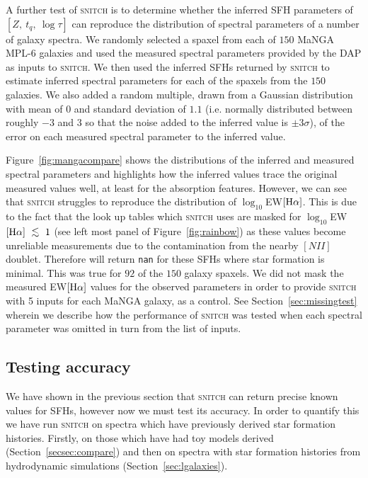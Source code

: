 \documentclass[useAMS,usenatbib]{mn2e}
\def\lesssim{\mathrel{\hbox{\rlap{\hbox{\lower3pt\hbox{$\sim$}}}\hbox{\raise2pt\hbox{$<$}}}}}
\begin{document}
A further test of \textsc{snitch} is to determine whether the inferred SFH parameters of $[Z,~t_q,~\log\tau]$ can reproduce the distribution of spectral parameters of a number of galaxy spectra. We randomly selected a spaxel from each of $150$ MaNGA MPL-6 galaxies  and used the measured spectral parameters provided by the DAP as inputs to \textsc{snitch}. We then used the inferred SFHs returned by \textsc{snitch} to estimate inferred spectral parameters for each of the spaxels from the $150$ galaxies. We also added a random multiple, drawn from a Gaussian distribution with mean of $0$ and standard deviation of $1.1$ (i.e. normally distributed between roughly $-3$ and $3$ so that the noise added to the inferred value is $\pm3\sigma$), of the error on each measured spectral parameter to the inferred value.

Figure~\ref{fig:mangacompare} shows the distributions of the inferred and measured spectral parameters and highlights how the inferred values trace the original measured values well, at least for the absorption features. However, we can see that \textsc{snitch} struggles to reproduce the distribution of $\log_{10}$EW$[\rm{H}\alpha]$. This is due to the fact that the look up tables which \textsc{snitch} uses are masked for $\log_{10}$EW$[\rm{H}\alpha]~\lesssim~1$ (see left most panel of Figure~\ref{fig:rainbow}) as these values become unreliable measurements due to the contamination from the nearby $[NII]$ doublet. Therefore  will return \texttt{nan} for these SFHs where star formation is minimal. This was true for $92$ of the $150$ galaxy spaxels. We did not mask the measured EW$[\rm{H}\alpha]$ values for the observed parameters in order to provide \textsc{snitch} with 5 inputs for each MaNGA galaxy, as a control. See Section~\ref{sec:missingtest} wherein we describe how the performance of \textsc{snitch} was tested when each spectral parameter was omitted in turn from the list of inputs. 

\subsection{Testing accuracy}\label{sec:accuracytest}

We have shown in the previous section that \textsc{snitch} can return precise known values for SFHs, however now we must test its accuracy. In order to quantify this we have run \textsc{snitch} on spectra which have previously derived star formation histories. Firstly, on those which have had toy models derived (Section~\ref{secsec:compare}) and then on spectra with star formation histories from hydrodynamic simulations (Section~\ref{sec:lgalaxies}).
\end{document}
